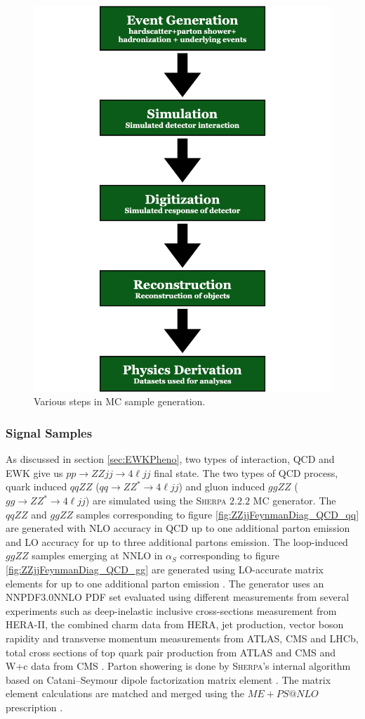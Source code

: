 \begin{figure}
\centering
\includegraphics[width=.8\linewidth]{figures/AnalysisOverview/MCSchematic.pdf}  
  \caption{Various steps in MC sample generation.}
\label{fig:MCGenerationSchematic}
\end{figure}

\subsubsection{Signal Samples}
\label{subsubsec:SigSamples}
As discussed in section \ref{sec:EWKPheno}, two types of interaction, QCD and EWK give us $pp \rightarrow ZZjj\rightarrow 4 \ell jj$ final state. The two types of QCD process, quark induced $qqZZ$ ($qq \rightarrow ZZ^* \rightarrow 4 \ell jj$) and gluon induced $ggZZ$ ($gg \rightarrow ZZ^* \rightarrow 4\ell jj$) are simulated using the \textsc{Sherpa} $2.2.2$ MC generator. The $qqZZ$ and $ggZZ$ samples corresponding to figure \ref{fig:ZZjjFeynmanDiag_QCD_qq} are generated with NLO accuracy in QCD up to one additional parton emission and LO accuracy for up to three additional partons emission. The loop-induced $ggZZ$ samples emerging at NNLO in $\alpha_{S}$ corresponding to figure \ref{fig:ZZjjFeynmanDiag_QCD_gg} are generated using LO-accurate matrix elements for up to one additional parton emission \cite{EventGenWithSherpa}. The generator uses an NNPDF3.0NNLO PDF set evaluated using different measurements from several experiments such as deep-inelastic inclusive cross-sections measurement from HERA-II, the combined charm data from HERA, jet production, vector boson rapidity and transverse momentum measurements from ATLAS, CMS and LHCb, total cross sections of top quark pair production from ATLAS and CMS and W+c data from CMS \cite{PDFForRunII}. Parton showering is done by \textsc{Sherpa}'s internal algorithm based on Catani–Seymour dipole factorization matrix element \cite{SherpaPS}. The matrix element calculations are matched and merged using the $ME+PS@NLO$ prescription \cite{PSMatching}. 

